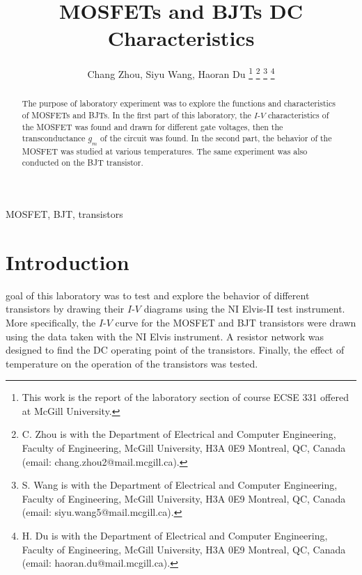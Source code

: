 \documentclass[journal]{IEEEtran}
\begin{document}
\begin{titlepage}

\end{titlepage}
\title{MOSFETs and BJTs DC Characteristics}
\author{Chang Zhou, Siyu Wang, Haoran Du
\thanks{This work is the report of the laboratory section of course ECSE 331 offered at McGill University.}
\thanks{C. Zhou is with the Department of Electrical and Computer
Engineering, Faculty of Engineering, McGill University, H3A 0E9 Montreal, QC, Canada
(email: chang.zhou2@mail.mcgill.ca).}
\thanks{S. Wang is with the Department of Electrical and Computer
Engineering, Faculty of Engineering, McGill University, H3A 0E9 Montreal, QC, Canada
(email: siyu.wang5@mail.mcgill.ca).}
\thanks{H. Du is with the Department of Electrical and Computer
Engineering, Faculty of Engineering, McGill University, H3A 0E9 Montreal, QC, Canada
(email: haoran.du@mail.mcgill.ca).}}

\maketitle

\begin{abstract}
  The purpose of laboratory experiment was to explore the functions
  and characteristics of MOSFETs and BJTs. In the first part of this laboratory,
  the $I$-$V$ characteristics of the MOSFET was found and drawn for different gate voltages,
  then the transconductance $g_{m}$ of the circuit was found. In the second part,
  the behavior of the MOSFET was studied at various temperatures.
  The same experiment was also conducted on the BJT transistor.
\end{abstract}

\begin{IEEEkeywords}
  MOSFET, BJT, transistors
\end{IEEEkeywords}

\section{Introduction}

 goal of this laboratory was to test and explore the behavior of
 different transistors by drawing their $I$-$V$ diagrams using the NI Elvis-II test instrument.
 More specifically, the $I$-$V$ curve for the MOSFET and BJT transistors were drawn
 using the data taken with the NI Elvis instrument. A resistor network was designed
 to find the DC operating point of the transistors.
 Finally, the effect of temperature on the operation of the transistors was tested.
\end{document}
